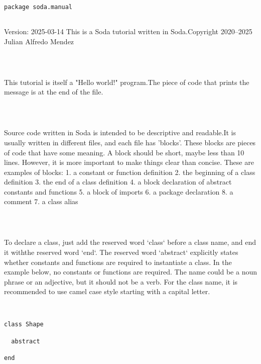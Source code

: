 \documentclass[12pt,a4paper]{article}
\begin{document}
\begin{lstlisting}
package soda.manual


\end{lstlisting}

Version: 2025-03-14 This is a Soda tutorial written in Soda.Copyright 2020--2025 Julian Alfredo Mendez


\begin{lstlisting}



\end{lstlisting}

This tutorial is itself a "Hello world!" program.The piece of code that prints the message is at the end of the file. 


\begin{lstlisting}



\end{lstlisting}

Source code written in Soda is intended to be descriptive and readable.It is usually written in different files, and each file has 'blocks'.
These blocks are pieces of code that have some meaning.
A block should be short, maybe less than 10 lines.
However, it is more important to make things clear than concise.
These are examples of blocks:
1. a constant or function definition
2. the beginning of a class definition
3. the end of a class definition
4. a block declaration of abstract constants and functions
5. a block of imports
6. a package declaration
8. a comment 7. a class alias


\begin{lstlisting}



\end{lstlisting}

To declare a class, just add the reserved word `class` before a class name, and end it withthe reserved word `end`.
The reserved word `abstract` explicitly states whether constants and functions are required
to instantiate a class. In the example below, no constants or functions are required.
The name could be a noun phrase or an adjective, but it should not be a verb. For the class name, it is recommended to use camel case style starting with a capital letter.


\begin{lstlisting}


class Shape

  abstract

end


\end{lstlisting}
\end{document}
